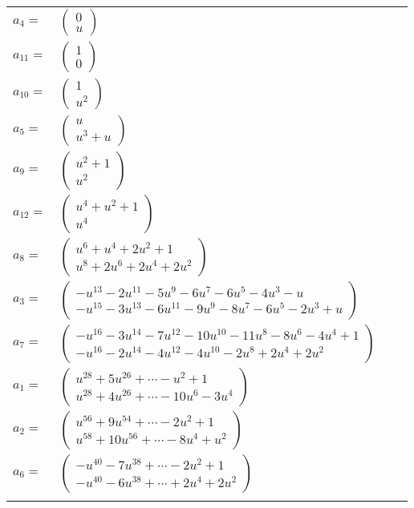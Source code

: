 \documentclass[1p]{elsarticle_modified}
\theoremstyle{definition}
\begin{document}
\begin{tabular}{m{7pt} m{180pt} m{7pt} m{180pt} }
\flushright $a_{4}=$&$\begin{pmatrix}0\\u\end{pmatrix}$ \\
\flushright $a_{11}=$&$\begin{pmatrix}1\\0\end{pmatrix}$ \\
\flushright $a_{10}=$&$\begin{pmatrix}1\\u^2\end{pmatrix}$ \\
\flushright $a_{5}=$&$\begin{pmatrix}u\\u^3+u\end{pmatrix}$ \\
\flushright $a_{9}=$&$\begin{pmatrix}u^2+1\\u^2\end{pmatrix}$ \\
\flushright $a_{12}=$&$\begin{pmatrix}u^4+u^2+1\\u^4\end{pmatrix}$ \\
\flushright $a_{8}=$&$\begin{pmatrix}u^6+u^4+2 u^2+1\\u^8+2 u^6+2 u^4+2 u^2\end{pmatrix}$ \\
\flushright $a_{3}=$&$\begin{pmatrix}- u^{13}-2 u^{11}-5 u^9-6 u^7-6 u^5-4 u^3- u\\- u^{15}-3 u^{13}-6 u^{11}-9 u^9-8 u^7-6 u^5-2 u^3+u\end{pmatrix}$ \\
\flushright $a_{7}=$&$\begin{pmatrix}- u^{16}-3 u^{14}-7 u^{12}-10 u^{10}-11 u^8-8 u^6-4 u^4+1\\- u^{16}-2 u^{14}-4 u^{12}-4 u^{10}-2 u^8+2 u^4+2 u^2\end{pmatrix}$ \\
\flushright $a_{1}=$&$\begin{pmatrix}u^{28}+5 u^{26}+\cdots- u^2+1\\u^{28}+4 u^{26}+\cdots-10 u^6-3 u^4\end{pmatrix}$ \\
\flushright $a_{2}=$&$\begin{pmatrix}u^{56}+9 u^{54}+\cdots-2 u^2+1\\u^{58}+10 u^{56}+\cdots-8 u^4+u^2\end{pmatrix}$ \\
\flushright $a_{6}=$&$\begin{pmatrix}- u^{40}-7 u^{38}+\cdots-2 u^2+1\\- u^{40}-6 u^{38}+\cdots+2 u^4+2 u^2\end{pmatrix}$\\&\end{tabular}
\end{document}
